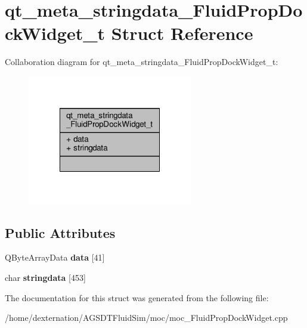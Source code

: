 \hypertarget{structqt__meta__stringdata___fluid_prop_dock_widget__t}{\section{qt\-\_\-meta\-\_\-stringdata\-\_\-\-Fluid\-Prop\-Dock\-Widget\-\_\-t Struct Reference}
\label{structqt__meta__stringdata___fluid_prop_dock_widget__t}
}


Collaboration diagram for qt\-\_\-meta\-\_\-stringdata\-\_\-\-Fluid\-Prop\-Dock\-Widget\-\_\-t\-:\nopagebreak
\begin{figure}[H]
\begin{center}
\leavevmode
\includegraphics[width=204pt]{structqt__meta__stringdata___fluid_prop_dock_widget__t__coll__graph}
\end{center}
\end{figure}
\subsection*{Public Attributes}
\begin{DoxyCompactItemize}
\item 
\hypertarget{structqt__meta__stringdata___fluid_prop_dock_widget__t_a4ec27da0a498540f17a8b4012ba7010a}{Q\-Byte\-Array\-Data {\bfseries data} \mbox{[}41\mbox{]}}\label{structqt__meta__stringdata___fluid_prop_dock_widget__t_a4ec27da0a498540f17a8b4012ba7010a}

\item 
\hypertarget{structqt__meta__stringdata___fluid_prop_dock_widget__t_a853bb9fbb11a9682d7c74ce25980bf6c}{char {\bfseries stringdata} \mbox{[}453\mbox{]}}\label{structqt__meta__stringdata___fluid_prop_dock_widget__t_a853bb9fbb11a9682d7c74ce25980bf6c}

\end{DoxyCompactItemize}


The documentation for this struct was generated from the following file\-:\begin{DoxyCompactItemize}
\item 
/home/dexternation/\-A\-G\-S\-D\-T\-Fluid\-Sim/moc/moc\-\_\-\-Fluid\-Prop\-Dock\-Widget.\-cpp\end{DoxyCompactItemize}
